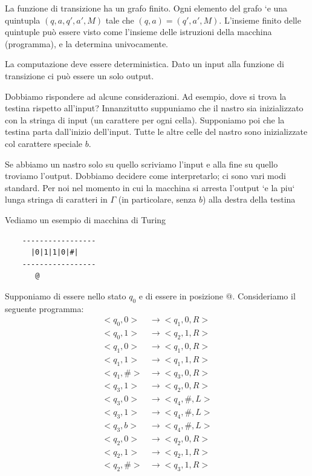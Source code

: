 La funzione di transizione ha un grafo finito. Ogni elemento del grafo `e una quintupla $(q, a, q',
a', M)$ tale che $(q, a) = (q', a', M)$. L'insieme finito delle quintuple può essere visto come
l'insieme delle istruzioni della macchina (programma), e la determina univocamente.

La computazione deve essere deterministica. Dato un input alla funzione di transizione ci può
essere un solo output.

Dobbiamo rispondere ad alcune considerazioni. Ad esempio, dove si trova la testina rispetto
all'input?  Innanzitutto suppuniamo che il nastro sia inizializzato con la stringa di input (un
carattere per ogni cella). Supponiamo poi che la testina parta dall'inizio dell'input. Tutte le
altre celle del nastro sono inizializzate col carattere speciale $b$.

Se abbiamo un nastro solo su quello scriviamo l'input e alla fine su quello troviamo l'output.
Dobbiamo decidere come interpretarlo; ci sono vari modi standard. Per noi nel momento in cui la
macchina si arresta l'output `e la piu` lunga stringa di caratteri in $\Gamma$ (in particolare,
senza $b$) alla destra della testina

Vediamo un esempio di macchina di Turing 

\begin{verbatim}
    -----------------
      |0|1|1|0|#|
    -----------------
       @
\end{verbatim}

Supponiamo di essere nello stato $q_{0}$ e di essere in posizione @. Consideriamo il seguente programma:
\begin{align*}
    <q_{0},0> &\to <q_{1},0,R>\\
    <q_{0},1> &\to <q_{2},1,R>\\
    <q_{1},0> &\to <q_{1},0,R>\\
    <q_{1},1> &\to <q_{1},1,R>\\
    <q_{1},\#> &\to <q_{3},0,R>\\
    <q_{3},1> &\to <q_{2},0,R>\\
    <q_{3},0> &\to <q_{4},\#,L>\\
    <q_{3},1> &\to <q_{4},\#,L>\\
    <q_{3},b> &\to <q_{4},\#,L>\\
    <q_{2},0> &\to <q_{2},0,R>\\
    <q_{2},1> &\to <q_{2},1,R>\\
    <q_{2},\#> &\to <q_{3},1,R>
\end{align*}

